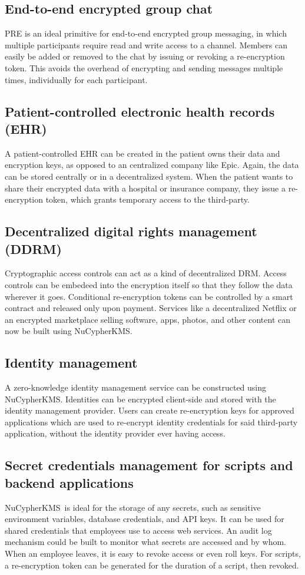 \documentclass[notitlepage,longbibliography]{revtex4-1}
\newcommand{\kms}{NuCypherKMS}
\begin{document}
\subsection{End-to-end encrypted group chat}
PRE is an ideal primitive for end-to-end encrypted group messaging, in which multiple participants require read and write
access to a channel. Members can easily be added or removed to the chat by issuing or revoking a re-encryption token.
This avoids the overhead of encrypting and sending messages multiple times, individually for each participant.

\subsection{Patient-controlled electronic health records (EHR)}
A patient-controlled EHR can be created in the patient owns their data and encryption keys, as opposed to an centralized
company like Epic.
Again, the data can be stored centrally or in a decentralized system.
When the patient wants to share their encrypted data with a hospital or insurance company, they issue a re-encryption token,
which grants temporary access to the third-party.

\subsection{Decentralized digital rights management (DDRM)}
Cryptographic access controls can act as a kind of decentralized DRM.
Access controls can be embedeed into the encryption itself so that they follow the data wherever it goes.
Conditional re-encryption tokens can be controlled by a smart contract and released only upon payment.
Services like a decentralized Netflix or an encrypted marketplace selling software, apps, photos, and other content
can now be built using \kms.

\subsection{Identity management}
A zero-knowledge identity management service can be constructed using \kms. Identities can be encrypted client-side and stored with the
identity management provider. Users can create re-encryption keys for approved applications which are used to re-encrypt identity
credentials for said third-party application, without the identity provider ever having access.

\subsection{Secret credentials management for scripts and backend applications}
\kms~is ideal for the storage of any secrets, such as sensitive environment variables, database credentials, and API keys.
It can be used for shared credentials that employees use to access web services.
An audit log mechanism could be built to monitor what secrets are accessed and by whom.
When an employee leaves, it is easy to revoke access or even roll keys.
For scripts, a re-encryption token can be generated for the duration of a script, then revoked.
\end{document}
